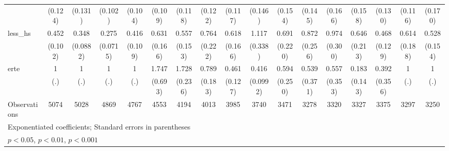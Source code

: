 {\begin{tabular}{l*{16}{c}}
                    &     (0.124)         &     (0.131)         &     (0.102)         &     (0.104)         &     (0.109)         &     (0.118)         &     (0.122)         &     (0.117)         &     (0.146)         &     (0.154)         &     (0.145)         &     (0.166)         &     (0.158)         &     (0.130)         &     (0.116)         &     (0.170)         \\
[1em]
less\_hs             &       0.452\sym{***}&       0.348\sym{***}&       0.275\sym{***}&       0.416\sym{***}&       0.631         &       0.557\sym{*}  &       0.764         &       0.618         &       1.117         &       0.691         &       0.872         &       0.974         &       0.646         &       0.468\sym{**} &       0.614         &       0.528\sym{*}  \\
                    &     (0.102)         &    (0.0882)         &    (0.0715)         &     (0.109)         &     (0.166)         &     (0.153)         &     (0.222)         &     (0.166)         &     (0.338)         &     (0.220)         &     (0.256)         &     (0.300)         &     (0.213)         &     (0.129)         &     (0.188)         &     (0.154)         \\
[1em]
erte                &           1         &           1         &           1         &           1         &       1.747         &       1.728\sym{***}&       0.789         &       0.461\sym{**} &       0.416\sym{***}&       0.594         &       0.539         &       0.557         &       0.183\sym{*}  &       0.392         &           1         &           1         \\
                    &         (.)         &         (.)         &         (.)         &         (.)         &     (0.693)         &     (0.236)         &     (0.183)         &     (0.127)         &    (0.0992)         &     (0.250)         &     (0.371)         &     (0.353)         &     (0.143)         &     (0.356)         &         (.)         &         (.)         \\
\hline
Observations        &        5074         &        5028         &        4869         &        4767         &        4553         &        4194         &        4013         &        3985         &        3740         &        3471         &        3278         &        3320         &        3327         &        3375         &        3297         &        3250         \\
\hline\hline
\multicolumn{17}{l}{\footnotesize Exponentiated coefficients; Standard errors in parentheses}\\
\multicolumn{17}{l}{\footnotesize \sym{*} \(p<0.05\), \sym{**} \(p<0.01\), \sym{***} \(p<0.001\)}\\
\end{tabular}
}
